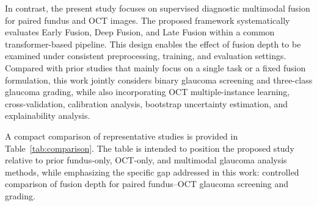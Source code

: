 \documentclass[preprint,12pt]{elsarticle}
\begin{document}
In contrast, the present study focuses on supervised diagnostic multimodal fusion for paired fundus and OCT images. The proposed framework systematically evaluates Early Fusion, Deep Fusion, and Late Fusion within a common transformer-based pipeline. This design enables the effect of fusion depth to be examined under consistent preprocessing, training, and evaluation settings. Compared with prior studies that mainly focus on a single task or a fixed fusion formulation, this work jointly considers binary glaucoma screening and three-class glaucoma grading, while also incorporating OCT multiple-instance learning, cross-validation, calibration analysis, bootstrap uncertainty estimation, and explainability analysis.

A compact comparison of representative studies is provided in Table~\ref{tab:comparison}. The table is intended to position the proposed study relative to prior fundus-only, OCT-only, and multimodal glaucoma analysis methods, while emphasizing the specific gap addressed in this work: controlled comparison of fusion depth for paired fundus--OCT glaucoma screening and grading.
\end{document}
